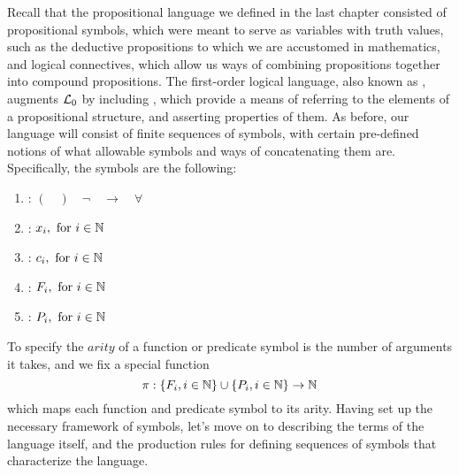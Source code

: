 \documentclass{article}
\begin{document}
Recall that the propositional language we defined in the last chapter consisted of propositional symbols, which were meant to serve as variables with truth values, such as the deductive propositions to which we are accustomed in mathematics, and logical connectives, which allow us ways of combining propositions together into compound propositions. The first-order logical language, also known as , augments $ \mathcal{L}_0 $ by including , which provide a means of referring to the elements of a propositional structure, and asserting properties of them.
\nn
As before, our language will consist of finite sequences of symbols, with certain pre-defined notions of what allowable symbols and ways of concatenating them are. Specifically, the symbols are the following:
\begin{enumerate}
    \item {}: $ ( \quad ) \quad \neg \quad \rightarrow \quad \forall $
    \item {}: $ x_i, \text{ for } i \in \mathbb{N} $
    \item {}: $ c_i, \text{ for } i \in \mathbb{N} $
    \item {}: $ F_i, \text{ for } i \in \mathbb{N} $
    \item {}: $ P_i, \text{ for  } i \in \mathbb{N} $
\end{enumerate}
\n
To specify the $ arity $ of a function or predicate symbol is the number of arguments it takes, and we fix a special function 
    $$ \pi: \{ F_i, i \in \mathbb{N} \} \cup \{ P_i, i \in \mathbb{N} \} \rightarrow \mathbb{N} $$
which maps each function and predicate symbol to its arity. Having set up the necessary framework of symbols, let's move on to describing the terms of the language itself, and the production rules for defining sequences of symbols that characterize the language.
\end{document}

